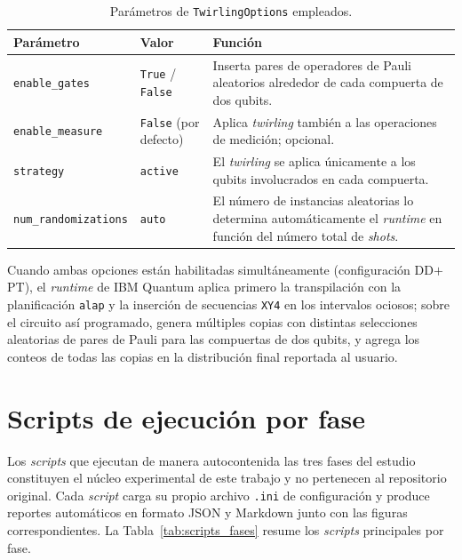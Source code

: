 \documentclass[12pt, spanish]{book}
\begin{document}
\begin{table}[H]
    \centering
    \caption{Parámetros de \texttt{TwirlingOptions} empleados.}
    \label{tab:pt_config}
    \footnotesize
    \begin{tabular}{p{} p{} p{}}
        \toprule
        \textbf{Parámetro} & \textbf{Valor} & \textbf{Función} \\
        \midrule
        \texttt{enable\_gates}
            & \texttt{True} / \texttt{False}
            & Inserta pares de operadores de Pauli aleatorios alrededor de cada compuerta de dos qubits. \\
        \midrule
        \texttt{enable\_measure}
            & \texttt{False} (por defecto)
            & Aplica \textit{twirling} también a las operaciones de medición; opcional. \\
        \midrule
        \texttt{strategy}
            & \texttt{active}
            & El \textit{twirling} se aplica únicamente a los qubits involucrados en cada compuerta. \\
        \midrule
        \texttt{num\_randomizations}
            & \texttt{auto}
            & El número de instancias aleatorias lo determina automáticamente el \textit{runtime} en función del número total de \textit{shots}. \\
        \bottomrule
    \end{tabular}
\end{table}

Cuando ambas opciones están habilitadas simultáneamente (configuración DD$+$PT), el \textit{runtime} de IBM Quantum aplica primero la transpilación con la planificación \texttt{alap} y la inserción de secuencias \texttt{XY4} en los intervalos ociosos; sobre el circuito así programado, genera múltiples copias con distintas selecciones aleatorias de pares de Pauli para las compuertas de dos qubits, y agrega los conteos de todas las copias en la distribución final reportada al usuario.

\section{Scripts de ejecución por fase}
\label{app:scripts-fases}

Los \textit{scripts} que ejecutan de manera autocontenida las tres fases del estudio constituyen el núcleo experimental de este trabajo y no pertenecen al repositorio original. Cada \textit{script} carga su propio archivo \texttt{.ini} de configuración y produce reportes automáticos en formato JSON y Markdown junto con las figuras correspondientes. La Tabla~\ref{tab:scripts_fases} resume los \textit{scripts} principales por fase.
\end{document}
